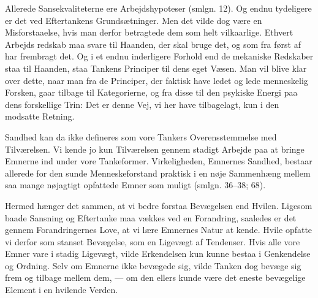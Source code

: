 \documentclass[12pt,a4paper]{book}
\newcommand{\opage}[1]{\marginnote{\footnotesize\textit{[#1]}}}
\begin{document}
Allerede Sansekvaliteterne ere Arbejdshypoteser (smlgn. 12). Og endnu tydeligere er
det ved Eftertankens Grundsætninger. Men det vilde dog være en Misforstaaelse, hvis
man derfor betragtede dem som helt vilkaarlige. Ethvert Arbejds%
\opage{258}redskab maa svare
til Haanden, der skal bruge det, og som fra først af har frembragt det. Og i et
endnu inderligere Forhold end de mekaniske Redskaber staa til Haanden, staa Tankens
Principer til dens eget Væsen. Man vil blive klar over dette, naar man fra de
Principer, der faktisk have ledet og lede menneskelig Forsken, gaar tilbage til
Kategorierne, og fra disse til den psykiske Energi paa dens forskellige Trin: Det
er denne Vej, vi her have tilbagelagt, kun i den modsatte Retning.

Sandhed kan da ikke defineres som vore Tankers Overensstemmelse med Tilværelsen. Vi
kende jo kun Tilværelsen gennem stadigt Arbejde paa at bringe Emnerne ind under
vore Tankeformer. Virkeligheden, Emnernes Sandhed, bestaar allerede for den sunde
Menneskeforstand praktisk i en nøje Sammenhæng mellem saa mange nøjagtigt opfattede
Emner som muligt (smlgn. 36--38; 68).

Hermed hænger det sammen, at vi bedre forstaa Bevægelsen end Hvilen. Ligesom baade
Sansning og Eftertanke maa vækkes ved en Forandring, saaledes er det gennem
Forandringernes Love, at vi lære Emnernes Natur at kende. Hvile opfatte vi derfor
som stanset Bevægelse, som en Ligevægt af Tendenser. Hvis alle vore Emner vare i
stadig Ligevægt, vilde Erkendelsen kun kunne bestaa i Genkendelse og Ordning. Selv
om Emnerne ikke bevægede sig, vilde Tanken dog bevæge sig frem og tilbage mellem
dem, --- om den ellers kunde være det eneste bevægelige Element i en hvilende
Verden.
\end{document}
